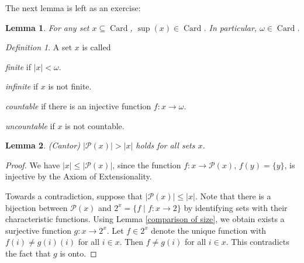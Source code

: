 \documentclass[a4paper, 11pt]{amsart}
\newtheorem{lemma}[lemma]{Lemma}
\theoremstyle{remark}
\newtheorem{definition}[definition]{Definition}
\newcommand{\pow}{\mathcal{P}}
\DeclareMathOperator{\Card}{Card}
\newenvironment{enumerate-(1)}{\begin{enumerate}[label={\upshape (\arabic*)}, leftmargin=2pc]}{\end{enumerate}}
\begin{document}
The next lemma is left as an exercise: 

\begin{lemma} 
For any set $x\subseteq \Card$, $\sup(x)\in \Card$. 
In particular, $\omega\in \Card$. 
\end{lemma} 


\begin{definition} 
A set $x$ is called 
\begin{enumerate-(1)} 
\item 
\emph{finite} if $|x|<\omega$. 
\item 
\emph{infinite} if $x$ is not finite. 
\item 
\emph{countable} if there is an injective function $f\colon x\rightarrow \omega$. 
\item 
\emph{uncountable} if $x$ is not countable. 
\end{enumerate-(1)} 
\end{definition} 


\begin{lemma}(Cantor) 
$|\pow(x)|>|x|$ holds for all sets $x$. 
\end{lemma} 
\begin{proof} 
We have $|x|\leq |\pow(x)|$, since the function $f\colon x\rightarrow \pow(x)$, $f(y)=\{y\}$, is injective by the Axiom of Extensionality. 

Towards a contradiction, suppose that $|\pow(x)| \leq |x|$. 
Note that there is a bijection between $\pow(x)$ and $2^x= \{f\mid f\colon x\rightarrow 2 \}$ by identifying sets with their characteristic functions. 
Using Lemma \ref{comparison of size}, we obtain exists a surjective function $g\colon x \rightarrow 2^x$. 
Let $f\in 2^x$ denote the unique function with $f(i)\neq g(i)(i)$ for all $i\in x$. 
Then $f\neq g(i)$ for all $i\in x$. 
This contradicts the fact that $g$ is onto. 
\end{proof} 
\end{document}

